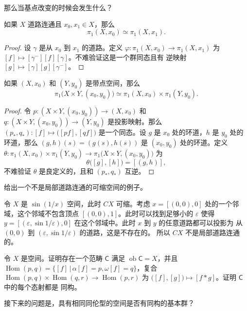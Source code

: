 \documentclass[fontset=none]{Notes}
\DeclareMathOperator\Hom{Hom}
\DeclareMathOperator\ob{ob}
\newcommand{\cat}[1]{\mathsf{#1}}
\begin{document}
那么当基点改变的时候会发生什么？

\begin{theorem}
  如果 $X$ 道路连通且 $x_0,x_1\in X$，那么
  \[
    \pi_1(X,x_0)\simeq \pi_1(X,x_1).
  \]
\end{theorem}
\begin{proof}
  设 $\gamma$ 是从 $x_0$ 到 $x_1$ 的道路。定义 $\varphi:\pi_1(X,x_0)\to\pi_1(X,x_1)$
  为 $[f]\mapsto [\gamma^-][f][\gamma]$。不难验证这是一个群同态且有
  逆映射 $[g]\mapsto [\gamma][g][\gamma^-]$。
\end{proof}

\begin{theorem}
  如果 $(X,x_0)$ 和 $(Y,y_0)$ 是带点空间，那么
  \[
    \pi_1\bigl(X\times Y,(x_0,y_0)\bigr)\simeq \pi_1(X,x_0)\times \pi_1(Y,y_0).
  \]
\end{theorem}
\begin{proof}
  令 $p:(X\times Y,(x_0,y_0))\to (X,x_0)$ 和 $q:(X\times Y,(x_0,y_0))\to (Y,y_0)$
  是投影映射。那么 $(p_*,q_*):[f]\mapsto \bigl([pf],[qf]\bigr)$
  是一个同态。设 $g$ 是 $x_0$ 处的环道，$h$ 是 $y_0$ 处的环道，那么
  $(g,h)(s)=(g(s),h(s))$ 是 $(x_0,y_0)$ 处的环道。定义 
  $\theta:\pi_1(X,x_0)\times \pi_1(Y,y_0)\to \pi_1\bigl(X\times Y,(x_0,y_0)\bigr)$
  为
  \[
    \theta\bigl([g],[h]\bigr)=[(g,h)],
  \]
  不难验证 $\theta$ 是良定义的，且和 $(p_*,q_*)$ 互逆。
\end{proof}

\begin{problem}{}{}
  给出一个不是局部道路连通的可缩空间的例子。
\end{problem}
\begin{solution}
  令 $X$ 是 $\sin(1/x)$ 空间，此时 $CX$ 可缩。考虑 $x=[(0,0),0]$
  处的一个邻域，这个邻域不包含顶点 $[(0,0),1]$。此时可以找到足够小的
  $\varepsilon$ 使得 $y=[(\varepsilon,\sin 1/\varepsilon),0]$
  在这个邻域中。此时 $x$ 到 $y$ 的任意道路都可以投影为
  从 $(0,0)$ 到 $(\varepsilon,\sin 1/\varepsilon)$ 的道路，这是不存在的。
  所以 $CX$ 不是局部道路连通的。
\end{solution}

\begin{problem}{}{}
  令 $X$ 是空间。证明存在一个范畴 $\cat C$ 满足 $\ob\cat C=X$，并且
  $\Hom(p,q)=\{[f]\,|\,\alpha[f]=p,\omega[f]=q\}$，复合
  $\Hom(p,q)\times \Hom(q,r)\to\Hom(p,r)$ 为
  $\bigl([f],[g]\bigr)\mapsto [f*g]$。证明 $\cat C$ 中的每个态射都是
  同构。
\end{problem}

接下来的问题是，具有相同同伦型的空间是否有同构的基本群？
\end{document}

